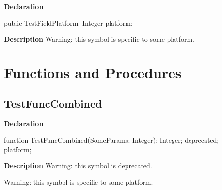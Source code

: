 \documentclass{report}
\begin{document}
\begin{list}{}{
\setlength{\itemindent}{0cm}
\setlength{\listparindent}{0cm}
\setlength{\leftmargin}{\evensidemargin}
\addtolength{\leftmargin}{\tmplength}
\settowidth{\labelsep}{X}
\addtolength{\leftmargin}{\labelsep}
\setlength{\labelwidth}{\tmplength}
}
\begin{flushleft}
\item[\textbf{Declaration}\hfill]
\begin{ttfamily}
public TestFieldPlatform: Integer platform;\end{ttfamily}


\end{flushleft}
\par
\item[\textbf{Description}]
Warning: this symbol is specific to some platform.

 

\end{list}
\section{Functions and Procedures}
\subsection*{TestFuncCombined}
\begin{list}{}{
\setlength{\itemindent}{0cm}
\setlength{\listparindent}{0cm}
\setlength{\leftmargin}{\evensidemargin}
\addtolength{\leftmargin}{\tmplength}
\settowidth{\labelsep}{X}
\addtolength{\leftmargin}{\labelsep}
\setlength{\labelwidth}{\tmplength}
}
\begin{flushleft}
\item[\textbf{Declaration}\hfill]
\begin{ttfamily}
function TestFuncCombined(SomeParams: Integer): Integer; deprecated; platform;\end{ttfamily}


\end{flushleft}
\par
\item[\textbf{Description}]
Warning: this symbol is deprecated.

Warning: this symbol is specific to some platform.

 

\end{list}
\end{document}
